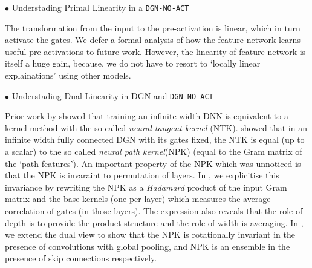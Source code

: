 
$\bullet$ Understading Primal Linearity in a \texttt{DGN-NO-ACT}

The transformation from the input to the pre-activation is linear, which in turn activate the gates. We defer a formal analysis of how the feature network learns useful pre-activations to future work. However, the linearity of feature network is itself a huge gain, because, we do not have to resort to `locally linear explainations' using other models.

$\bullet$ Understading Dual Linearity in DGN and \texttt{DGN-NO-ACT}

Prior work by \cite{ntk,arora2019exact,cao2019generalization} showed that training an infinite width DNN is equivalent to a kernel method with the so called \emph{neural tangent kernel} (NTK). \citep{npk} showed that in an infinite width fully connected DGN with its gates fixed, the NTK is equal (up to a scalar) to the so called \emph{neural path kernel}(NPK) (equal to the Gram matrix of the `path features'). An important property of the NPK which was unnoticed is that the NPK is invaraint to permutation of layers. In , we explicitise this invariance by rewriting the NPK as a \emph{Hadamard} product of the input Gram matrix and the base kernels (one per layer) which measures the average correlation of gates (in those layers). The expression also reveals that the role of depth is to provide the product structure and the role of width is averaging. %
In , we extend the dual view to show that the NPK is rotationally invariant in the presence of convolutions with global pooling, and NPK is an ensemble in the presence of skip connections respectively. 

